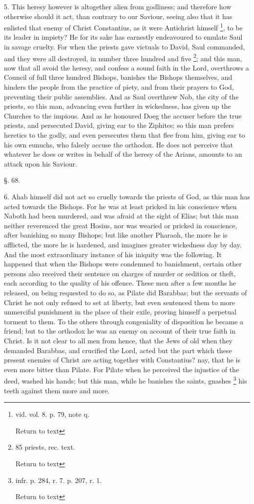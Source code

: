 5. This heresy however is altogether alien from
godliness; and therefore how otherwise should it act, than contrary to
our Saviour, seeing also that it has enlisted that enemy of Christ
Constantius, as it were Antichrist himself \footnote{vid. vol. 8. p. 79, note q.

Return to text}, to be its leader
in impiety? He for its sake has earnestly endeavoured to emulate Saul
in savage cruelty. For when the priests gave victuals to David, Saul
commanded, and they were all destroyed, in number three hundred and
five \footnote{85 priests, rec. text.

Return to text}; and this man, now that all avoid the heresy, and
confess a sound faith in the Lord, overthrows a Council of full three
hundred Bishops, banishes the Bishops themselves, and hinders the
people from the practice of piety, and from their prayers to God,
preventing their public assemblies. And as Saul overthrew Nob, the
city of the priests, so this man, advancing even further in
wickedness, has given up the Churches to the impious. And as he
honoured Doeg the accuser before the true priests, and
persecuted David, giving ear to the Ziphites; so this man prefers
heretics to the godly, and even persecutes them that flee from him,
giving ear to his own eunuchs, who falsely accuse the orthodox. He
does not perceive that whatever he does or writes in behalf of the
heresy of the Arians, amounts to an attack upon his Saviour.

§. 68.

6. Ahab himself did not act so cruelly towards
the priests of God, as this man has acted towards the Bishops. For he
was at least pricked in his conscience when Naboth had been murdered,
and was afraid at the sight of Elias; but this man neither reverenced
the great Hosius, nor was wearied or pricked in conscience, after
banishing so many Bishops; but like another Pharaoh, the more he is
afflicted, the more he is hardened, and imagines greater wickedness
day by day. And the most extraordinary instance of his iniquity was
the following. It happened that when the Bishops were condemned to
banishment, certain other persons also received their sentence on
charges of murder or sedition or theft, each according to the quality
of his offence. These men after a few months he released, on being
requested to do so, as Pilate did Barabbas; but the servants of Christ
he not only refused to set at liberty, but even sentenced them to more
unmerciful punishment in the place of their exile, proving himself a
perpetual torment to them. To the others through congeniality of
disposition he became a friend; but to the orthodox he was an enemy on
account of their true faith in Christ. Is it not clear to all men from
hence, that the Jews of old when they demanded Barabbas, and crucified
the Lord, acted but the part which these present enemies of Christ are
acting together with Constantius? nay, that he is even more bitter
than Pilate. For Pilate when he perceived the injustice of the deed,
washed his hands; but this man, while he banishes the saints, gnashes
\footnote{infr. p. 284, r. 7. p. 207, r. 1.

Return to text} his teeth against them more and more.

